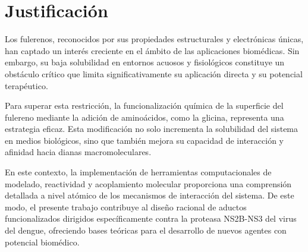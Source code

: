 \titleformat{\chapter}[display]
  {\normalfont\bfseries}{}{0pt}{\Large} %
\chapter{Justificación}
Los fulerenos, reconocidos por sus propiedades estructurales y electrónicas únicas, han captado un interés creciente en el ámbito de las aplicaciones biomédicas. Sin embargo, su baja solubilidad en entornos acuosos y fisiológicos constituye un obstáculo crítico que limita significativamente su aplicación directa y su potencial terapéutico.

Para superar esta restricción, la funcionalización química de la superficie del fulereno mediante la adición de aminoácidos, como la glicina, representa una estrategia eficaz. Esta modificación no solo incrementa la solubilidad del sistema en medios biológicos, sino que también mejora su capacidad de interacción y afinidad hacia dianas macromoleculares.

En este contexto, la implementación de herramientas computacionales de modelado, reactividad y acoplamiento molecular proporciona una comprensión detallada a nivel atómico de los mecanismos de interacción del sistema. De este modo, el presente trabajo contribuye al diseño racional de aductos funcionalizados dirigidos específicamente contra la proteasa NS2B-NS3 del virus del dengue, ofreciendo bases teóricas para el desarrollo de nuevos agentes con potencial biomédico.